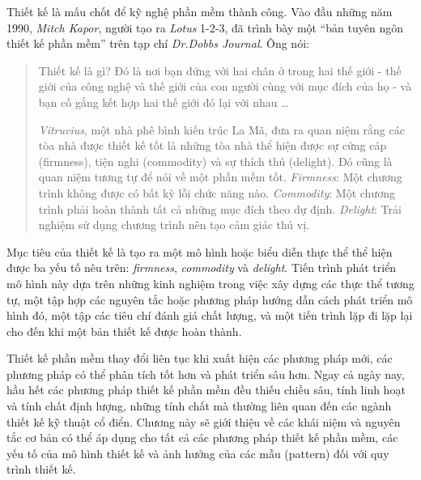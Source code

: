 \documentclass[12pt, a4paper]{article}
\begin{document}
	Thiết kế là mấu chốt để kỹ nghệ phần mềm thành công. Vào đầu những năm 1990, \textit{ Mitch Kapor}, người tạo ra \textit{Lotus} 1-2-3, đã trình bày một “bản tuyên ngôn thiết kế phần mềm” trên tạp chí \textit{Dr.Dobbs Journal}. Ông nói:
	
	
	
	\begin{quotation}
	Thiết kế là gì? Đó là nơi bạn đứng với hai chân ở trong hai thế giới - thế giới của công nghệ và thế giới của con người  cùng với  mục đích của họ - và bạn cố gắng kết hợp hai thế giới đó lại với nhau \ldots
		
		
		\textit{Vitruvius}, một nhà phê bình kiến trúc La Mã, đưa ra quan niệm rằng các tòa nhà được thiết kế tốt là những tòa nhà thể hiện được sự cứng cáp (firmness), tiện nghi (commodity) và sự thích thú (delight). Đó cũng là quan niệm tương tự để nói về một phần mềm tốt.\textit{ Firmness}: Một chương trình không được có bất kỳ lỗi chức năng nào. \textit{Commodity}: Một chương trình phải hoàn thành tất cả những mục đích theo dự định. \textit{Delight}: Trải nghiệm sử dụng chương trình nên tạo cảm giác thú vị. 
	\end{quotation}	
	
	Mục tiêu của thiết kế là tạo ra một mô hình hoặc biểu diễn thực thể thể hiện được ba yếu tố nêu trên: \textit{firmness}, \textit{commodity} và \textit{delight}. Tiến trình phát triển mô hình này dựa trên những kinh nghiệm trong việc xây dựng các thực thể tương tự, một tập hợp các nguyên tắc hoặc phương pháp hướng dẫn cách phát triển mô hình đó, một tập các tiêu chí đánh giá chất lượng, và một tiến trình lặp đi lặp lại cho đến khi một bản thiết kế được hoàn thành.
	
	
	Thiết kế phần mềm thay đổi liên tục khi xuất hiện các phương pháp mới, các phương pháp có thể phân tích tốt hơn và phát triển sâu hơn. Ngay cả ngày nay, hầu hết các phương pháp thiết kế phần mềm đều thiếu chiều sâu, tính linh hoạt và tính chất định lượng, những tính chất mà thường liên quan đến các ngành thiết kế kỹ thuật cổ điển. Chương này sẽ giới thiệu về các khái niệm và nguyên tắc cơ bản có thể áp dụng cho tất cả các phương pháp thiết kế phần mềm, các yếu tố của mô hình thiết kế và ảnh hưởng của các mẫu (pattern) đối với quy trình thiết kế.

	
	
	
	
	
	
	
	
	\clearpage
	
	
	\clearpage
	
	\nocite{*}
	\printbibliography[heading=bibintoc, title=Tài liệu tham khảo]
	\printindex
	
\end{document}
